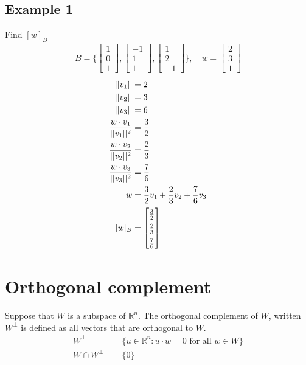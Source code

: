 \documentclass{article}
\theoremstyle{mytheoremstyle}
\theoremstyle{mytheoremstyle}
\theoremstyle{myproblemstyle}
\begin{document}
    \subsection*{Example 1}
    Find $[w]_B$
    \begin{align*}
        B = \Bigg\{
            \begin{bmatrix}
                1 \\ 0 \\ 1
            \end{bmatrix},
            \begin{bmatrix}
                -1 \\ 1 \\ 1
            \end{bmatrix},
            \begin{bmatrix}
                1 \\ 2 \\ -1
            \end{bmatrix}
       \Bigg\},\quad w = \begin{bmatrix}
        2 \\ 3 \\ 1
       \end{bmatrix}
    \end{align*}
    \begin{align*}
       ||v_1|| &= 2 \\
       ||v_2|| &= 3 \\
       ||v_3|| &= 6 \\
       \frac{w\cdot v_1}{||v_1||^2} &= \frac{3}{2} \\
       \frac{w\cdot v_2}{||v_2||^2} &= \frac{2}{3} \\
       \frac{w\cdot v_3}{||v_3||^2} &= \frac{7}{6} \\
       w &= \frac{3}{2} v_1 + \frac{2}{3} v_2 + \frac{7}{6} v_3 \\
       [w]_B &= \renewcommand{\arraystretch}{1.4}\begin{bmatrix}
            \frac{3}{2} \\ \frac{2}{3} \\ \frac{7}{6}
       \end{bmatrix}
    \end{align*}

    \section*{Orthogonal complement}
    Suppose that $W$ is a subspace of $\mathbb{R}^n$. The orthogonal complement
    of $W$, written $W^\perp$ is defined as all vectors that are orthogonal to
    $W$.
    \begin{align*}
        W^\perp &= \{ u\in\mathbb{R}^n : u\cdot w = 0 \text{ for all } w \in W\} \\
        W\cap W^\perp &= \{0\}
    \end{align*}
\end{document}
